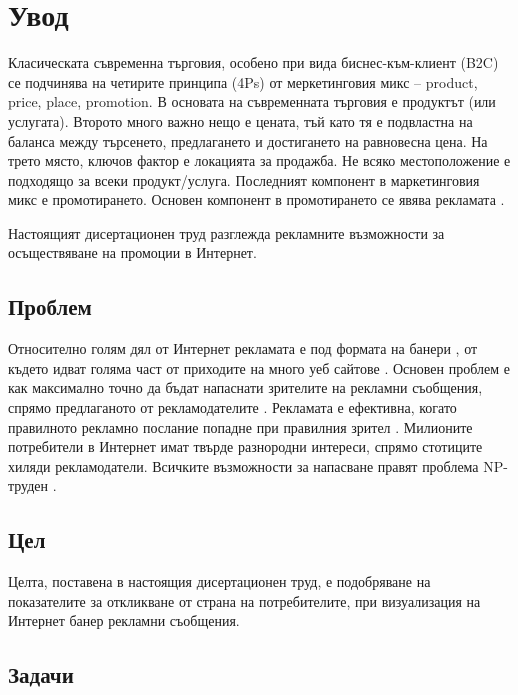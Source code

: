 \chapter*{Увод}

Класическата съвременна търговия, особено при вида биснес-към-клиент (B2C) се подчинява на четирите принципа (4Ps) от меркетинговия микс – product, price, place, promotion. В основата на съвременната търговия е продуктът (или услугата). Второто много важно нещо е цената, тъй като тя е подвластна на баланса между търсенето, предлагането и достигането на равновесна цена. На трето място, ключов фактор е локацията за продажба. Не всяко местоположение е подходящо за всеки продукт/услуга. Последният компонент в маркетинговия микс е промотирането. Основен компонент в промотирането се явява рекламата \cite{POCOL170134}. 

Настоящият дисертационен труд разглежда рекламните възможности за осъществяване на промоции в Интернет. 

\section*{Проблем}

Относително голям дял от Интернет рекламата е под формата на банери \cite{1597398, usmonova_dilfuza_ilkhomovna_usmanov_shak_2022_7110290}, от където идват голяма част от приходите на много уеб сайтове \cite{7325200}. Основен проблем е как максимално точно да бъдат напаснати зрителите на рекламни съобщения, спрямо предлаганото от рекламодателите \cite{MIRALLESPECHUAN201839}. Рекламата е ефективна, когато правилното рекламно послание попадне при правилния зрител \cite{10.1145/2339530.2339655}. Милионите потребители в Интернет имат твърде разнородни интереси, спрямо стотиците хиляди рекламодатели. Всичките възможности за напасване правят проблема NP-труден \cite{KIM2020106226}.

\section*{Цел}

Целта, поставена в настоящия дисертационен труд, е подобряване на показателите за откликване от страна на потребителите, при визуализация на Интернет банер рекламни съобщения. 

\section*{Задачи}

